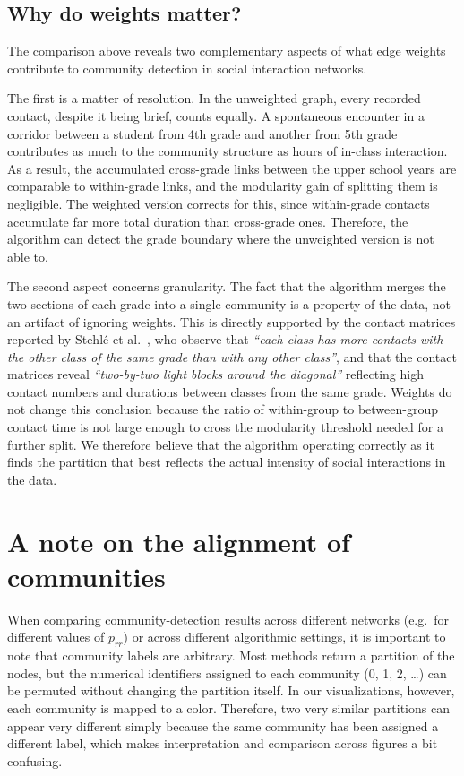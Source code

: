 \documentclass{article}
\begin{document}
\subsection{Why do weights matter?}
 
The comparison above reveals two complementary aspects of what edge weights contribute to community detection in social interaction networks.
 
The first is a matter of resolution. In the unweighted graph, every recorded contact, despite it being brief, counts equally. A spontaneous encounter in a corridor between a student from 4th grade and another from 5th grade contributes as much to the community structure as hours of in-class interaction. As a result, the accumulated cross-grade links between the upper school years are comparable to within-grade links, and the modularity gain of splitting them is negligible. The weighted version corrects for this, since within-grade contacts accumulate far more total duration than cross-grade ones. Therefore, the algorithm can detect the grade boundary where the unweighted version is not able to.
 
The second aspect concerns granularity. The fact that the algorithm merges the two sections of each grade into a single community is a property of the data, not an artifact of ignoring weights. This is directly supported by the contact matrices reported by Stehlé et al.\ \cite{stehle2011high}, who observe that \textit{``each class has more contacts with the other class of the same grade than with any other class''}, and that the contact matrices reveal \textit{``two-by-two light blocks around the diagonal''} reflecting high contact numbers and durations between classes from the same grade. Weights do not change this conclusion because the ratio of within-group to between-group contact time is not large enough to cross the modularity threshold needed for a further split. We therefore believe that the algorithm operating correctly as it finds the partition that best reflects the actual intensity of social interactions in the data.

\section{A note on the alignment of communities}

When comparing community-detection results across different networks (e.g.\ for different values of $p_{rr}$) or across different algorithmic settings, it is important to note that community labels are arbitrary. Most methods return a partition of the nodes, but the numerical identifiers assigned to each community (0, 1, 2, \dots) can be permuted without changing the partition itself. In our visualizations, however, each community is mapped to a color. Therefore, two very similar partitions can appear very different simply because the same community has been assigned a different label, which makes interpretation and comparison across figures a bit confusing.
\end{document}
